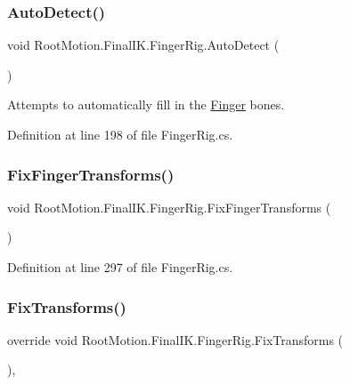 \subsubsection{\texorpdfstring{Auto\+Detect()}{AutoDetect()}}
{\footnotesize\ttfamily void Root\+Motion.\+Final\+I\+K.\+Finger\+Rig.\+Auto\+Detect (\begin{DoxyParamCaption}{ }\end{DoxyParamCaption})}



Attempts to automatically fill in the \mbox{\hyperlink{class_root_motion_1_1_final_i_k_1_1_finger}{Finger}} bones. 



Definition at line 198 of file Finger\+Rig.\+cs.

\mbox{\label{class_root_motion_1_1_final_i_k_1_1_finger_rig_a07b2ccee722533677eaac8031cc24258}} 
\subsubsection{\texorpdfstring{Fix\+Finger\+Transforms()}{FixFingerTransforms()}}
{\footnotesize\ttfamily void Root\+Motion.\+Final\+I\+K.\+Finger\+Rig.\+Fix\+Finger\+Transforms (\begin{DoxyParamCaption}{ }\end{DoxyParamCaption})}



Definition at line 297 of file Finger\+Rig.\+cs.

\mbox{\label{class_root_motion_1_1_final_i_k_1_1_finger_rig_ab11b46b8b2c81897b17c451c4c536b1f}} 
\subsubsection{\texorpdfstring{Fix\+Transforms()}{FixTransforms()}}
{\footnotesize\ttfamily override void Root\+Motion.\+Final\+I\+K.\+Finger\+Rig.\+Fix\+Transforms (\begin{DoxyParamCaption}{ }\end{DoxyParamCaption})\hspace{0.3cm}{\ttfamily [protected]}, {\ttfamily [virtual]}}



